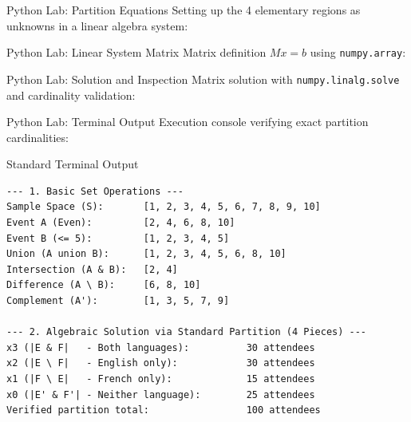 \documentclass[10pt,aspectratio=169]{beamer}
\begin{document}
\begin{frame}[fragile]{Python Lab: Partition Equations}
  Setting up the 4 elementary regions as unknowns in a linear algebra system:
  \vspace{0.1em}
  {
  }
\end{frame}

\begin{frame}[fragile]{Python Lab: Linear System Matrix}
  Matrix definition $M x = b$ using \texttt{numpy.array}:
  \vspace{0.1em}
  {
  }
\end{frame}

\begin{frame}[fragile]{Python Lab: Solution and Inspection}
  Matrix solution with \texttt{numpy.linalg.solve} and cardinality validation:
  \vspace{0.1em}
  {
  }
\end{frame}

\begin{frame}[fragile]{Python Lab: Terminal Output}
  Execution console verifying exact partition cardinalities:
  \vspace{0.1em}
  \begin{block}{Standard Terminal Output}
    \fontsize{6.5pt}{7.5pt}\selectfont
    \begin{verbatim}
--- 1. Basic Set Operations ---
Sample Space (S):       [1, 2, 3, 4, 5, 6, 7, 8, 9, 10]
Event A (Even):         [2, 4, 6, 8, 10]
Event B (<= 5):         [1, 2, 3, 4, 5]
Union (A union B):      [1, 2, 3, 4, 5, 6, 8, 10]
Intersection (A & B):   [2, 4]
Difference (A \ B):     [6, 8, 10]
Complement (A'):        [1, 3, 5, 7, 9]

--- 2. Algebraic Solution via Standard Partition (4 Pieces) ---
x3 (|E & F|   - Both languages):          30 attendees
x2 (|E \ F|   - English only):            30 attendees
x1 (|F \ E|   - French only):             15 attendees
x0 (|E' & F'| - Neither language):        25 attendees
Verified partition total:                 100 attendees
    \end{verbatim}
  \end{block}
\end{frame}
\end{document}
